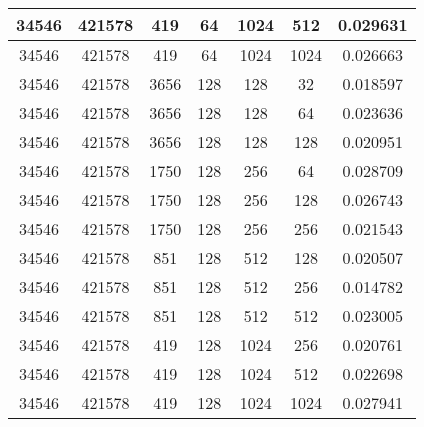 \documentclass[9pt]{article}
\begin{document}
\begin{tabular}{|c|c|c|c|c|c|c| }
\hline
34546  & 421578  & 419  & 64  & 1024  & 512  & 0.029631 \\
\hline
34546  & 421578  & 419  & 64  & 1024  & 1024  & 0.026663 \\
\hline
34546  & 421578  & 3656  & 128  & 128  & 32  & 0.018597 \\
\hline
34546  & 421578  & 3656  & 128  & 128  & 64  & 0.023636 \\
\hline
34546  & 421578  & 3656  & 128  & 128  & 128  & 0.020951 \\
\hline
34546  & 421578  & 1750  & 128  & 256  & 64  & 0.028709 \\
\hline
34546  & 421578  & 1750  & 128  & 256  & 128  & 0.026743 \\
\hline
34546  & 421578  & 1750  & 128  & 256  & 256  & 0.021543 \\
\hline
34546  & 421578  & 851  & 128  & 512  & 128  & 0.020507 \\
\hline
34546  & 421578  & 851  & 128  & 512  & 256  & 0.014782 \\
\hline
34546  & 421578  & 851  & 128  & 512  & 512  & 0.023005 \\
\hline
34546  & 421578  & 419  & 128  & 1024  & 256  & 0.020761 \\
\hline
34546  & 421578  & 419  & 128  & 1024  & 512  & 0.022698 \\
\hline
34546  & 421578  & 419  & 128  & 1024  & 1024  & 0.027941 \\
\hline
\end{tabular}
 
\end{document}
